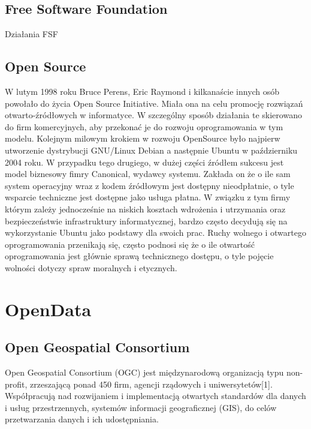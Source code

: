 \subsection{Free Software Foundation}
Działania FSF 
\subsection{Open Source}
	W lutym 1998 roku Bruce Perens, Eric Raymond i kilkanaście innych osób powołało do życia Open Source Initiative. Miała ona na celu promocję rozwiązań otwarto-źródłowych w informatyce. W szczególny sposób działania te skierowano do firm komercyjnych, aby przekonać je do rozwoju oprogramowania w tym modelu.
	Kolejnym milowym krokiem w rozwoju OpenSource było najpierw utworzenie dystrybucji GNU/Linux Debian a następnie Ubuntu w październiku 2004 roku. W przypadku tego drugiego, w dużej części źródłem sukcesu jest model biznesowy fimry Canonical, wydawcy systemu. Zakłada on że o ile sam system operacyjny wraz z kodem źródłowym jest dostępny nieodpłatnie, o tyle wsparcie techniczne jest dostępne jako usługa płatna. W związku z tym firmy którym zależy jednocześnie na niskich kosztach wdrożenia i utrzymania oraz bezpieczeństwie infrastruktury informatycznej, bardzo często decydują się na wykorzystanie Ubuntu jako podstawy dla swoich prac.
	Ruchy wolnego i otwartego oprogramowania przenikają się, często podnosi się że o ile otwartość oprogramowania jest głównie sprawą technicznego dostępu, o tyle pojęcie wolności dotyczy spraw moralnych i etycznych.
\section{OpenData}
\subsection{Open Geospatial Consortium}
Open Geospatial Consortium (OGC) jest międzynarodową organizacją typu non-profit, zrzeszającą ponad 450 firm, agencji rządowych i uniwersytetów[1]. Współpracują nad rozwijaniem i implementacją otwartych standardów dla danych i usług przestrzennych, systemów informacji geograficznej (GIS), do celów przetwarzania danych i ich udostępniania.

